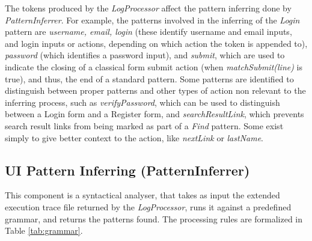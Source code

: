 \documentclass[10pt, conference, compsocconf]{IEEEtran}
\begin{document}
The tokens produced by the \textit{LogProcessor} affect the pattern inferring done by \textit{PatternInferrer}. For example, the patterns involved in the inferring of the \textit{Login} pattern are \textit{username, email, login} (these identify username and email inputs, and login inputs or actions, depending on which action the token is appended to), \textit{password} (which identifies a password input),  and \textit{submit}, which are used to indicate the closing of a classical form submit action (when \textit{matchSubmit(line)} is true), and thus, the end of a standard pattern. Some patterns are identified to distinguish between proper patterns and other types of action non relevant to the inferring process, such as \textit{verifyPassword}, which can be used to distinguish between a Login form and a Register form, and \textit{searchResultLink}, which prevents search result links from being marked as part of a \textit{Find} pattern. Some exist simply to give better context to the action, like \textit{nextLink} or \textit{lastName}.

\subsection{UI Pattern Inferring (PatternInferrer)}\label{sec:inf}

This component is a syntactical analyser, that takes as input the extended execution trace file returned by the \textit{LogProcessor}, runs it against a predefined grammar, and returns the patterns found. The processing rules are formalized in Table \ref{tab:grammar}.
\end{document}
